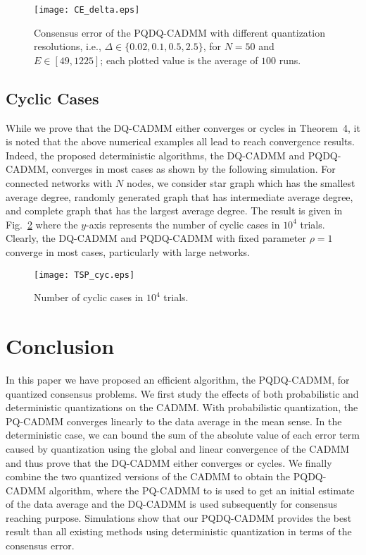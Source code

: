 \documentclass[journal]{IEEEtran}
\begin{document}
\begin{figure}[h]
\vspace{-0.15in}
	\centering
	\texttt{[image: CE\_delta.eps]}\caption{Consensus error of the PQDQ-CADMM with different quantization resolutions, i.e., $\Delta\in\{0.02, 0.1, 0.5, 2.5\}$, for $N=50$ and $E\in[49,1225]$; each plotted value is the average of $100$ runs.}
	\label{fig:CEDelta}
\end{figure}

\subsection{Cyclic Cases}
While we prove that the DQ-CADMM either converges or cycles in Theorem~4, it is noted that the above numerical examples all lead to reach convergence results. Indeed, the proposed deterministic algorithms, the DQ-CADMM and PQDQ-CADMM, converges in most cases as shown by the following simulation. For connected networks with $N$ nodes, we consider star graph which has the smallest average degree, randomly generated graph that has intermediate average degree, and complete graph that has the largest average degree. The result is given in Fig.~\ref{fig:cycnum} where the $y$-axis represents the number of cyclic cases in $10^4$ trials. Clearly, the DQ-CADMM and PQDQ-CADMM with fixed parameter $\rho=1$ converge in most cases, particularly with large networks. 
\vspace{-0.15in}
\begin{figure}[h]
    \centering
    {\texttt{[image: TSP\_cyc.eps]}}
      \caption{Number of cyclic cases in $10^4$ trials.}
      \label{fig:cycnum}
\end{figure}

\section{Conclusion}
\label{sec:conclusion}
In this paper we have proposed an efficient algorithm, the PQDQ-CADMM, for quantized consensus problems. We first study the effects of both probabilistic and deterministic quantizations on the CADMM. With probabilistic quantization, the PQ-CADMM converges linearly to the data average in the mean sense. In the deterministic case, we can bound the sum of the absolute value of each error term caused by quantization using the global and linear convergence of the CADMM and thus prove that the DQ-CADMM either converges or cycles. We finally combine the two quantized versions of the CADMM to obtain the PQDQ-CADMM algorithm, where the PQ-CADMM to is used to get an initial estimate of the data average and the DQ-CADMM is used subsequently for consensus reaching purpose. Simulations show that our PQDQ-CADMM provides the best result than all existing methods using deterministic quantization in terms of the consensus error.
\end{document}
